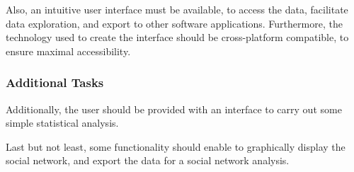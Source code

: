 Also, an intuitive user interface must be available, to access the data, facilitate data exploration, and export to other software applications. Furthermore, the technology used to create the interface should be cross-platform compatible, to ensure maximal accessibility.

\subsubsection{Additional Tasks}
\label{subsubsec:additional}
Additionally, the user should be provided with an interface to carry out some simple statistical analysis.

Last but not least, some functionality should enable to graphically display the social network, and export the data for a social network analysis. 